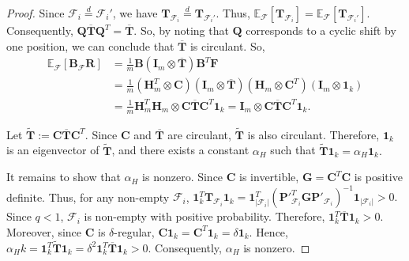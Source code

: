 \documentclass[10pt,a4paper]{amsart}
\newcommand{\bfB}{\mathbf{B}}
\newcommand{\bfC}{\mathbf{C}}
\newcommand{\bfF}{\mathbf{F}}
\newcommand{\bfH}{\mathbf{H}}
\newcommand{\bfI}{\mathbf{I}}
\newcommand{\bfT}{\mathbf{T}}
\newcommand{\cF}{\mathcal{F}}
\begin{document}
\begin{proof}
Since $\cF_i  \overset{d}{=} \cF_i'$, we have $\bfT_{\cF_i} \overset{d} {=} \bfT_{\cF_i'}$.   Thus, $\mathbb{E}_{\cF}\left[\bfT_{\cF_i}\right] = \mathbb{E}_{\cF}\left[\bfT_{\cF_i'}\right]$. Consequently, $
\mathbf{Q}\overline{\mathbf{T}}\mathbf{Q}^T
=
\overline{\mathbf{T}}.
$
So, by noting that $\mathbf{Q}$ corresponds to a cyclic shift by one position, we can conclude that $\overline{\mathbf{T}}$ is circulant. So,
\begin{align*}
\mathbb{E}_{\mathcal{F}}
[\mathbf{B}_{\mathcal{F}}\mathbf{R}]
&=
\frac{1}{m} \bfB (\mathbf{I}_m\otimes\overline{\mathbf{T}}) \mathbf{B}^T \bfF\\
&=
\frac{1}{m}(\mathbf{H}_m^T\otimes\mathbf{C})
\left(\mathbf{I}_m\otimes\overline{\mathbf{T}}
\right)
(\mathbf{H}_m\otimes\mathbf{C}^T)(\bfI_m \otimes \mathbf{1}_k)\\
&=\frac{1}{m} \bfH_m^T\bfH_m \otimes \bfC \overline{\mathbf{T}} \bfC^T\mathbf{1}_k = \bfI_m \otimes  \bfC \overline{\mathbf{T}} \bfC^T\mathbf{1}_k .
\end{align*}

Let
$
\tilde{\mathbf{T}}:=
\mathbf{C}\overline{\mathbf{T}}\mathbf{C}^T.$
Since $\mathbf{C}$ and $\overline{\mathbf{T}}$ are circulant,
$\tilde{\mathbf{T}}$ is also circulant. Therefore, $\mathbf{1}_k$ is an
eigenvector of $\tilde{\mathbf{T}}$, and there exists a constant $\alpha_H$
such that $\tilde{\mathbf{T}}\mathbf{1}_k=\alpha_H\mathbf{1}_k.$


It remains to show that $\alpha_H$ is nonzero. Since $\mathbf{C}$ is
invertible, $\mathbf{G}=\mathbf{C}^T\mathbf{C}$ is positive definite.
Thus, for any non-empty $\mathcal{F}_i$,
$
\mathbf{1}_k^T\mathbf{T}_{\mathcal{F}_i}\mathbf{1}_k
=
\mathbf{1}_{|\mathcal{F}_i|}^T
\left(
\mathbf{P}'^{T}_{\mathcal{F}_i}
\mathbf{G}
\mathbf{P}'_{\mathcal{F}_i}
\right)^{-1}
\mathbf{1}_{|\mathcal{F}_i|}
>0.
$
Since $q<1$, $\mathcal{F}_i$ is non-empty with positive probability.
Therefore,
$
\mathbf{1}_k^T\overline{\mathbf{T}}\mathbf{1}_k>0
.$ Moreover, since $\mathbf{C}$ is $\delta$-regular,
$\mathbf{C}\mathbf{1}_k=\mathbf{C}^T\mathbf{1}_k
=\delta\mathbf{1}_k$. Hence,
$
\alpha_H k
=
\mathbf{1}_k^T\widetilde{\mathbf{T}}\mathbf{1}_k
=
\delta^2
\mathbf{1}_k^T\overline{\mathbf{T}}\mathbf{1}_k
>0.
$ Consequently, $\alpha_H$ is nonzero.








\end{proof}
\end{document}
